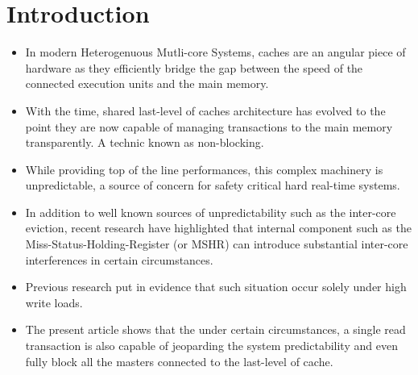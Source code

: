 \section{Introduction}
    \begin{itemize}
        \item In modern Heterogenuous Mutli-core Systems, caches are an angular piece of hardware as they efficiently bridge the gap between the speed of the connected execution units and the main memory.
        \item With the time, shared last-level of caches architecture has evolved to the point they are now capable of managing transactions to the main memory transparently. A technic known as non-blocking.
        \item While providing top of the line performances, this complex machinery is unpredictable, a source of concern for safety critical hard real-time systems.
        \item In addition to well known sources of unpredictability such as the inter-core eviction, recent research have highlighted that internal component such as the Miss-Status-Holding-Register (or MSHR) can introduce substantial inter-core interferences in certain circumstances.
        \item Previous research put in evidence that such situation occur solely under high write loads.
        \item The present article shows that the under certain circumstances, a single read transaction is also capable of jeoparding the system predictability and even fully block all the masters connected to the last-level of cache.
    \end{itemize}
